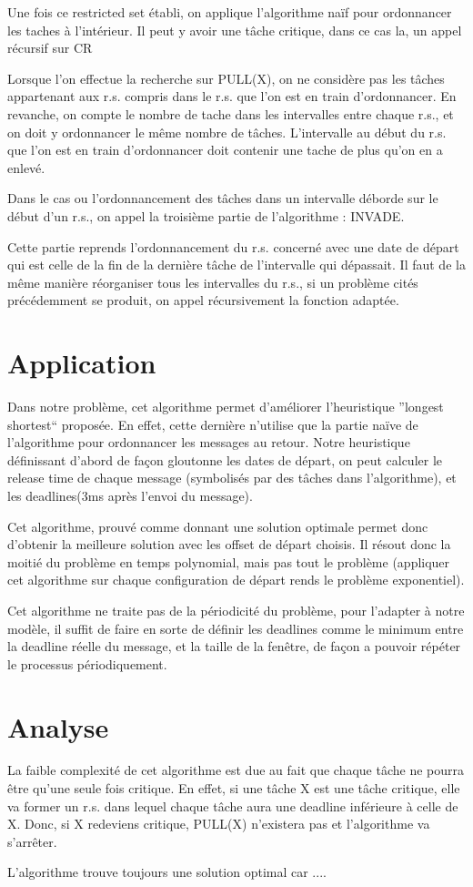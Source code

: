 \documentclass{article}
\begin{document}
Une fois ce restricted set établi, on applique l'algorithme naïf pour ordonnancer les taches à l’intérieur. Il peut y avoir une tâche critique,
dans ce cas la, un appel récursif sur CR

Lorsque l'on effectue la recherche sur PULL(X), on ne considère pas les tâches appartenant aux r.s. compris dans le r.s. que l'on est en train 
d'ordonnancer. En revanche, on compte le nombre de tache dans les intervalles entre chaque r.s., et on doit y ordonnancer le même nombre de tâches.
L'intervalle au début du r.s. que l'on est en train d'ordonnancer doit contenir une tache de plus qu'on en a enlevé.

Dans le cas ou l'ordonnancement des tâches dans un intervalle déborde sur le début d'un r.s., on appel la troisième partie de l'algorithme : INVADE.

Cette partie reprends l'ordonnancement du r.s. concerné avec une date de départ qui est celle de la fin de la dernière tâche de l'intervalle qui 
dépassait. Il faut de la même manière réorganiser tous les intervalles du r.s., si un problème cités précédemment se produit, on appel récursivement
la fonction adaptée.


\section{Application}
Dans notre problème, cet algorithme permet d'améliorer l'heuristique ''longest shortest`` proposée. En effet, cette dernière n'utilise que la partie
naïve de l'algorithme pour ordonnancer les messages au retour. Notre heuristique définissant d’abord de façon gloutonne les dates de départ,
on peut calculer le release time de chaque message (symbolisés par des tâches dans l'algorithme), et les deadlines(3ms après l'envoi du message).

Cet algorithme, prouvé comme donnant une solution optimale permet donc d'obtenir la meilleure solution avec les offset de départ choisis.
Il résout donc la moitié du problème en temps polynomial, mais pas tout le problème (appliquer cet algorithme sur chaque configuration de départ 
rends le problème exponentiel).

Cet algorithme ne traite pas de la périodicité du problème, pour l’adapter à notre modèle, il suffit de faire en sorte de définir les deadlines comme
le minimum entre la deadline réelle du message, et la taille de la fenêtre, de façon a pouvoir répéter le processus périodiquement.

\section{Analyse}

La faible complexité de cet algorithme est due au fait que chaque tâche ne pourra être qu'une seule fois critique.
En effet, si une tâche X est une tâche critique, elle va former un r.s. dans lequel chaque tâche aura une deadline inférieure à celle de X.
Donc, si X redeviens critique, PULL(X) n'existera pas et l'algorithme va s'arrêter.

L'algorithme trouve toujours une solution optimal car ....
\end{document}
